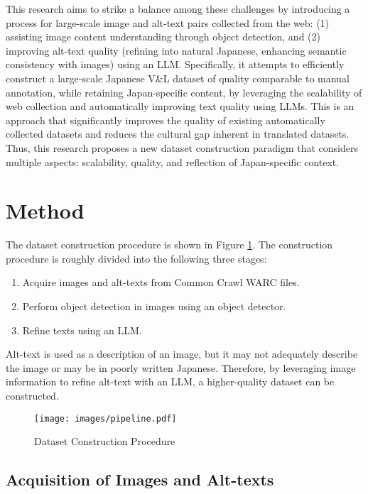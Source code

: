 \documentclass[11pt]{article}
\begin{document}
This research aims to strike a balance among these challenges by introducing a process for large-scale image and alt-text pairs collected from the web: (1) assisting image content understanding through object detection, and (2) improving alt-text quality (refining into natural Japanese, enhancing semantic consistency with images) using an LLM. Specifically, it attempts to efficiently construct a large-scale Japanese V\&L dataset of quality comparable to manual annotation, while retaining Japan-specific content, by leveraging the scalability of web collection and automatically improving text quality using LLMs. This is an approach that significantly improves the quality of existing automatically collected datasets and reduces the cultural gap inherent in translated datasets. Thus, this research proposes a new dataset construction paradigm that considers multiple aspects: scalability, quality, and reflection of Japan-specific context.

\section{Method}

The dataset construction procedure is shown in Figure \ref{fig:dataset_construction_procedure}. The construction procedure is roughly divided into the following three stages:

\begin{enumerate}
  \item Acquire images and alt-texts from Common Crawl WARC files.
  \item Perform object detection in images using an object detector.
  \item Refine texts using an LLM.
\end{enumerate}

Alt-text is used as a description of an image, but it may not adequately describe the image or may be in poorly written Japanese. Therefore, by leveraging image information to refine alt-text with an LLM, a higher-quality dataset can be constructed.

\begin{figure}[t]
  \centering
  \texttt{[image: images/pipeline.pdf]}
  \caption{Dataset Construction Procedure}
  \label{fig:dataset_construction_procedure}
\end{figure}

\subsection{Acquisition of Images and Alt-texts}
\end{document}

